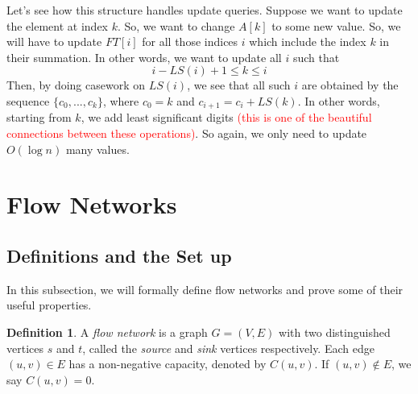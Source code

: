 \documentclass[12pt,a4paper]{amsart}
\numberwithin{equation}{section}
\theoremstyle{definition}
\newtheorem{Def}{Definition}[section]
\begin{document}
Let's see how this structure handles update queries. Suppose we want to update the element at index $k$. So, we want to change $A[k]$ to some new value. So, we will have to update $FT[i]$ for all those indices $i$ which include the index $k$ in their summation. In other words, we want to update all $i$ such that 
$$i - LS(i) + 1 \le k \le i$$
Then, by doing casework on $LS(i)$, we see that all such $i$ are obtained by the sequence $\{c_0,...,c_k\}$, where $c_0 = k$ and $c_{i + 1} = c_i + LS(k)$. In other words, starting from $k$, we add least significant digits \textcolor{red}{(this is one of the beautiful connections between these operations)}. So again, we only need to update $O(\log n)$ many values. 

\section{Flow Networks}
\subsection{Definitions and the Set up} In this subsection, we will formally define flow networks and prove some of their useful properties. 

\begin{Def}
	A \textit{flow network} is a graph $G = (V, E)$ with two distinguished vertices $s$ and $t$, called the \textit{source} and \textit{sink} vertices respectively. Each edge $(u, v)\in E$ has a non-negative capacity, denoted by $C(u, v)$. If $(u, v)\notin E$, we say $C(u, v) = 0$. 
\end{Def}
\end{document}
